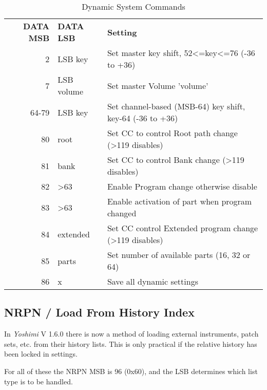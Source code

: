    \begin{table}[H]
      \centering
      \caption{Dynamic System Commands}
      \label{table:dynamic_system_commands}
      \begin{tabular}{r l l}

\textbf{DATA MSB} & \textbf{DATA LSB} & \textbf{Setting} \\

  2 & LSB key       & Set master key shift, 52\textless=key\textless=76 (-36 to +36) \\
  7 & LSB volume    & Set master Volume 'volume' \\
  64-79 & LSB key   & Set channel-based (MSB-64) key shift, key-64 (-36 to +36) \\
  80    & root      & Set CC to control Root path change (\textgreater119 disables) \\
  81    & bank      & Set CC to control Bank change (\textgreater119 disables) \\
  82    & \textgreater63       & Enable Program change otherwise disable \\
  83    & \textgreater63       & Enable activation of part when program changed \\
  84    & extended  & Set CC control Extended program change (\textgreater119 disables) \\
  85    & parts     & Set number of available parts (16, 32 or 64) \\
  86    & x         & Save all dynamic settings \\
      \end{tabular}
   \end{table}

\subsection{NRPN / Load From History Index}
\label{subsection:nrpns_load_from_history_index}
In \textsl{Yoshimi} V 1.6.0 there is now a method of loading external
instruments, patch sets, etc. from their history lists. This is only practical if
the relative history has been locked in settings.

For all of these the NRPN MSB is 96 (0x60), and the LSB determines which list
type is to be handled.


